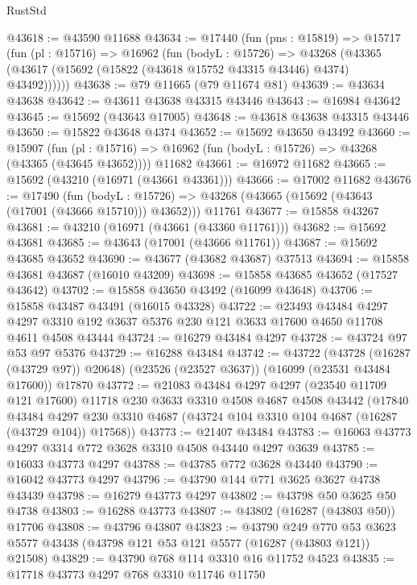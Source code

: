 \begin{lexlean}{RustStd}
\begin{coremodule}
@43618 := @43590 @11688
@43634 := @17440
    (fun (pns : @15819) =>
    @15717
      (fun (pl : @15716) =>
      @16962
        (fun (bodyL : @15726) =>
        @43268 (@43365 (@43617 (@15692 (@15822 (@43618 @15752 @43315 @43446) @4374) @43492))))))
@43638 := @79 @11665 (@79 @11674 @81)
@43639 := @43634 @43638
@43642 := @43611 @43638 @43315 @43446
@43643 := @16984 @43642
@43645 := @15692 (@43643 @17005)
@43648 := @43618 @43638 @43315 @43446
@43650 := @15822 @43648 @4374
@43652 := @15692 @43650 @43492
@43660 := @15907
    (fun (pl : @15716) => @16962 (fun (bodyL : @15726) => @43268 (@43365 (@43645 @43652))))
    @11682
@43661 := @16972 @11682
@43665 := @15692 (@43210 (@16971 (@43661 @43361)))
@43666 := @17002 @11682
@43676 := @17490
    (fun (bodyL : @15726) => @43268 (@43665 (@15692 (@43643 (@17001 (@43666 @15710))) @43652)))
    @11761
@43677 := @15858 @43267
@43681 := @43210 (@16971 (@43661 (@43360 @11761)))
@43682 := @15692 @43681
@43685 := @43643 (@17001 (@43666 @11761))
@43687 := @15692 @43685 @43652
@43690 := @43677 (@43682 @43687) @37513
@43694 := @15858 @43681 @43687 (@16010 @43209)
@43698 := @15858 @43685 @43652 (@17527 @43642)
@43702 := @15858 @43650 @43492 (@16099 @43648)
@43706 := @15858 @43487 @43491 (@16015 @43328)
@43722 := @23493
    @43484
    @4297
    @4297
    @3310
    @192
    @3637
    @5376
    @230
    @121
    @3633
    @17600
    @4650
    @11708
    @4611
    @4508
    @43444
@43724 := @16279 @43484 @4297
@43728 := @43724 @97 @53 @97 @5376
@43729 := @16288 @43484
@43742 := @43722
    (@43728 (@16287 (@43729 @97)) @20648)
    (@23526 (@23527 @3637))
    (@16099 (@23531 @43484 @17600))
    @17870
@43772 := @21083
    @43484
    @4297
    @4297
    (@23540 @11709 @121 @17600)
    @11718
    @230
    @3633
    @3310
    @4508
    @4687
    @4508
    @43442
    (@17840
      @43484
      @4297
      @230
      @3310
      @4687
      (@43724 @104 @3310 @104 @4687 (@16287 (@43729 @104)) @17568))
@43773 := @21407 @43484
@43783 := @16063 @43773 @4297 @3314 @772 @3628 @3310 @4508 @43440 @4297 @3639
@43785 := @16033 @43773 @4297
@43788 := @43785 @772 @3628 @43440
@43790 := @16042 @43773 @4297
@43796 := @43790 @144 @771 @3625 @3627 @4738 @43439
@43798 := @16279 @43773 @4297
@43802 := @43798 @50 @3625 @50 @4738
@43803 := @16288 @43773
@43807 := @43802 (@16287 (@43803 @50)) @17706
@43808 := @43796 @43807
@43823 := @43790
    @249
    @770
    @53
    @3623
    @5577
    @43438
    (@43798 @121 @53 @121 @5577 (@16287 (@43803 @121)) @21508)
@43829 := @43790 @768 @114 @3310 @16 @11752 @4523
@43835 := @17718 @43773 @4297 @768 @3310 @11746 @11750

\end{coremodule}
\end{lexlean}
